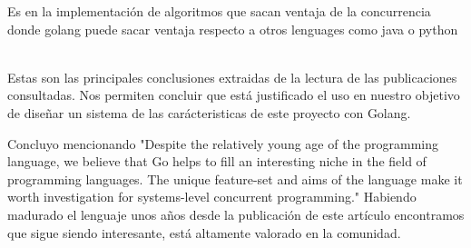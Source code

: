 Es en la implementación de algoritmos que sacan ventaja de la concurrencia donde golang puede sacar ventaja respecto a otros lenguages como java o python ~\cite{Jenkins201714}

Estas son las principales conclusiones extraidas de la lectura de las publicaciones consultadas.
\cite{Effendy20211955}
\cite{Dymora20201}
\cite{Meyerson2014104+101}
\cite{Ray202110857}
\cite{Jenkins201714}
\cite{Ding2021321}
\cite{Taheri2021138}
\cite{NoAuthor2021179}
\cite{Dilley2019377}
\cite{Qiu2018}
\cite{Shoumik20181}
\cite{Mladenovic2018}
\cite{Benedict2017437}
\cite{Irawan2017}
\cite{Samaniego2017116}
\cite{Khaitan20152909}
\cite{Leokhin2015656}
\cite{Komendantskaya2014121}
\cite{Mittal2014292}
\cite{WhiteheadII2011209}
Nos permiten concluir que está justificado el uso en nuestro objetivo de diseñar un sistema de las carácteristicas de este proyecto con Golang.

Concluyo mencionando \cite{WhiteheadII2011209}"Despite the relatively young age of the programming language, we believe that Go helps
to fill an interesting niche in the field of programming languages. The unique feature-set and
aims of the language make it worth investigation for systems-level concurrent programming." Habiendo madurado el lenguaje unos años desde la publicación de este artículo encontramos que sigue siendo interesante, está altamente valorado en la comunidad.


